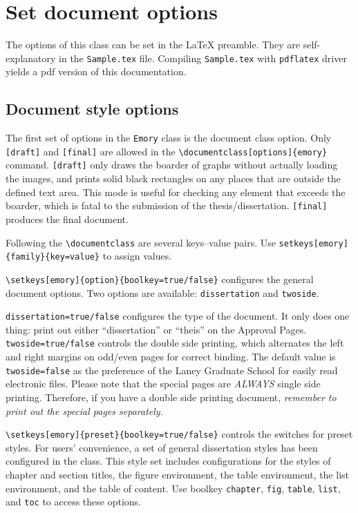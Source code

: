\documentclass[draft]{emory}
\begin{document}
\section{Set document options}\label{sec:options}
The options of this class can be set in the \LaTeX{} preamble. They are 
self-explanatory in the \Verb|Sample.tex| file.
Compiling \Verb|Sample.tex| with \Verb|pdflatex| driver yields a pdf version of this documentation.

\subsection{Document style options}
The first set of options in the \Verb|Emory| class is the document class option.
Only \Verb|[draft]| and \Verb|[final]| are allowed in the 
\Verb|\documentclass[options]{emory}| command.
\Verb|[draft]| only draws the boarder of graphs without actually loading the images,
and prints solid black rectangles on any places that are outside the defined text area. 
This mode is useful for checking any element that exceeds the boarder,
which is fatal to the submission of the thesis/dissertation.
\Verb|[final]| produces the final document. 

Following the \Verb|\documentclass| are several keys--value pairs.
Use \Verb|setkeys[emory]{family}{key=value}| to assign values.

\Verb|\setkeys[emory]{option}{boolkey=true/false}| configures the general document options.
Two options are available: \Verb|dissertation| and \Verb|twoside|.

\Verb|dissertation=true/false| configures the type of the document. 
It only does one thing: print out either ``dissertation'' or ``theis'' on the Approval Pages.
\Verb|twoside=true/false| controls the double side printing, which alternates the left and right margins on odd/even pages for correct binding.
The default value is \Verb|twoside=false| as the preference of the Laney Graduate School for easily read electronic files. 
Please note that the special pages are \emph{ALWAYS} single side printing. 
Therefore, if you have a double side printing document, \emph{remember to print out the special pages separately}.

\Verb|\setkeys[emory]{preset}{boolkey=true/false}| controls the switches for preset styles.
For users' convenience, a set of general dissertation styles has been configured in the class. 
This style set includes configurations for the styles of chapter and section 
titles, the figure environment, the table environment, the list environment, 
and the table of content. Use boolkey \Verb|chapter|, \Verb|fig|, \Verb|table|, 
\Verb|list|, and \Verb|toc| to access these options.
\end{document}
